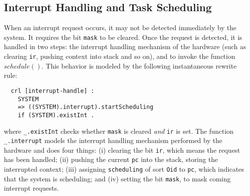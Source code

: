 \documentclass[10pt,journal]{IEEEtran}
\begin{document}
{\subsection{Interrupt Handling and Task Scheduling}
\label{ss:inthandling}
When an interrupt request occurs, it may not be detected immediately
by the system. It requires the bit \verb|mask| to be cleared. Once the
request is detected, it is handled in two steps: the interrupt
handling mechanism of the hardware (such as clearing \verb|ir|,
pushing context into stack and so on), and to invoke the function
$schedule()$. This behavior is modeled by the following instantaneous
rewrite rule:
\begin{verbatim}
  crl [interrupt-handle] :
    SYSTEM 
    => ((SYSTEM).interrupt).startScheduling
    if (SYSTEM).existInt .
\end{verbatim}
where \verb|_.existInt| checks whether \verb|mask| is cleared
\emph{and} \verb|ir| is set. The function \verb|_.interrupt| models
the interrupt handling mechanism performed by the hardware and does
four things: (i) clearing the bit \verb|ir|, which means the request
has been handled; (ii) pushing the current \verb|pc| into the stack,
storing the interrupted context; (iii) assigning \verb|scheduling| of
sort \verb|Oid| to \verb|pc|, which indicates that the system is
scheduling; and (iv) setting the bit \verb|mask|, to mask coming
interrupt requests.

}
\end{document}
